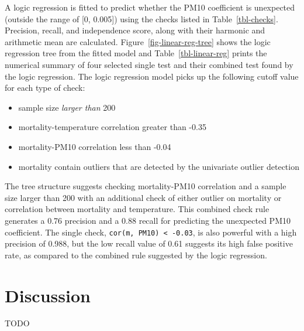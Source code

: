 \documentclass[
  12pt,
]{interact}
\providecommand{\tightlist}{%
  \setlength{\itemsep}{0pt}\setlength{\parskip}{0pt}}\usepackage{longtable,booktabs,array}
\begin{document}
A logic regression is fitted to predict whether the PM10 coefficient is
unexpected (outside the range of {[}0, 0.005{]}) using the checks listed
in Table~\ref{tbl-checks}. Precision, recall, and independence score,
along with their harmonic and arithmetic mean are calculated.
Figure~\ref{fig-linear-reg-tree} shows the logic regression tree from
the fitted model and Table~\ref{tbl-linear-reg} prints the numerical
summary of four selected single test and their combined test found by
the logic regression. The logic regression model picks up the following
cutoff value for each type of check:

\begin{itemize}
\tightlist
\item
  sample size \emph{larger than} 200
\item
  mortality-temperature correlation greater than -0.35
\item
  mortality-PM10 correlation less than -0.04
\item
  mortality contain outliers that are detected by the univariate outlier
  detection
\end{itemize}

The tree structure suggests checking mortality-PM10 correlation and a
sample size larger than 200 with an additional check of either outlier
on mortality or correlation between mortality and temperature. This
combined check rule generates a 0.76 precision and a 0.88 recall for
predicting the unexpected PM10 coefficient. The single check,
\texttt{cor(m,\ PM10)\ \textless{}\ -0.03}, is also powerful with a high
precision of 0.988, but the low recall value of 0.61 suggests its high
false positive rate, as compared to the combined rule suggested by the
logic regression.

\section{Discussion}\label{sec-discussion}

TODO
\end{document}
